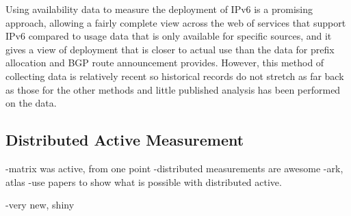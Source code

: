Using availability data to measure the deployment of IPv6 is a promising
approach, allowing a fairly complete view across the web of services that
support IPv6 compared to usage data that is only available for specific sources,
and it gives a view of deployment that is closer to actual use than the data for
prefix allocation and BGP route announcement provides. However, this method of
collecting data is relatively recent so historical records do not stretch as far
back as those for the other methods and little published
analysis has been performed on the data.

\subsection{Distributed Active Measurement}

-matrix was active, from one point
-distributed measurements are awesome
-ark, atlas
-use papers to show what is possible with distributed active.

-very new, shiny

